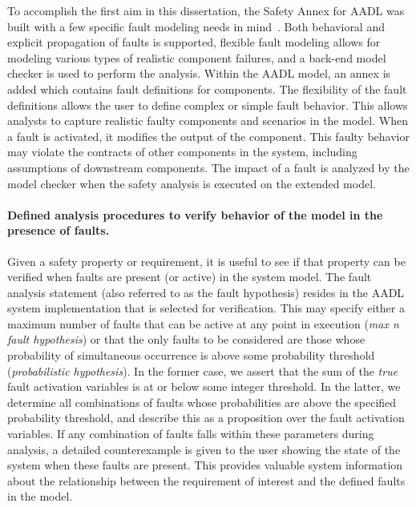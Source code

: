 To accomplish the first aim in this dissertation, the Safety Annex for AADL was built with a few specific fault modeling needs in mind~\cite{Stewart17:IMBSA}. Both behavioral and explicit propagation of faults is supported, flexible fault modeling allows for modeling various types of realistic component failures, and a back-end model checker is used to perform the analysis.  Within the AADL model, an annex is added which contains fault definitions for components. The flexibility of the fault definitions allows the user to define complex or simple fault behavior. This allows analysts to capture realistic faulty components and scenarios in the model. When a fault is activated, it modifies the output of the component. This faulty behavior may violate the contracts of other components in the system, including assumptions of downstream components. The impact of a fault is analyzed by the model checker when the safety analysis is executed on the extended model. 

\paragraph{Defined analysis procedures to verify behavior of the model in the presence of faults.}
Given a safety property or requirement, it is useful to see if that property can be verified when faults are present (or active) in the system model. The fault analysis statement (also referred to as the fault hypothesis) resides in the AADL system implementation that is selected for verification. This may specify either a maximum number of faults that can be active at any point in execution (\emph{max n fault hypothesis}) or that the only faults to be considered are those whose probability of simultaneous occurrence is above some probability threshold (\emph{probabilistic hypothesis}).  In the former case, we assert that the sum of the \emph{true} fault activation variables is at or below some integer threshold.  In the latter, we determine all combinations of faults whose probabilities are above the specified probability threshold, and describe this as a proposition over the fault activation variables. If any combination of faults falls within these parameters during analysis, a detailed counterexample is given to the user showing the state of the system when these faults are present. This provides valuable system information about the relationship between the requirement of interest and the defined faults in the model. 

